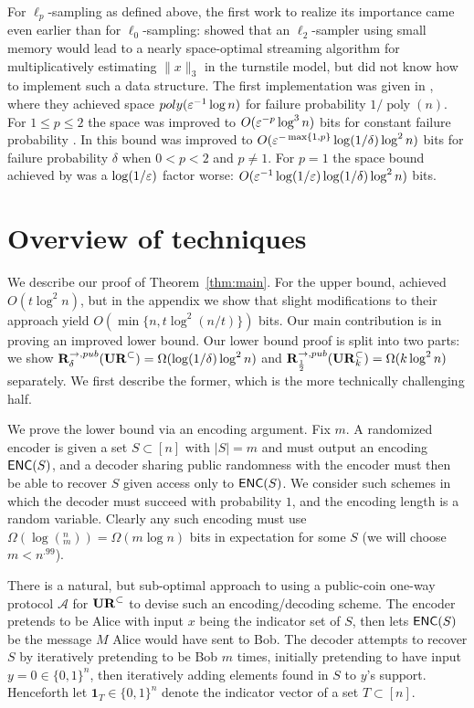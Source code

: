 For $\ell_p$-sampling as defined above, the first work to realize its importance came even earlier than for $\ell_0$-sampling: \cite{CoppersmithK04} showed that an $\ell_2$-sampler using small memory would lead to a nearly space-optimal streaming algorithm for multiplicatively estimating $\|x\|_3$ in the turnstile model, but did not know how to implement such a data structure. The first implementation was given in \cite{MonemizadehW10}, where they achieved space $\mathop{poly}(\varepsilon^{-1}\log n)$ for failure probability $1/\mathop{poly}(n)$. For $1\le p\le 2$ the space was improved to $O(\varepsilon^{-p}\log^3 n)$ bits for constant failure probability \cite{AndoniKO11}. In \cite{JowhariST11} this bound was improved to $O(\varepsilon^{-\max\{1,p\}}\log(1/\delta)\log^2 n)$ bits for failure probability $\delta$ when $0<p<2$ and $p\neq 1$. For $p=1$ the space bound achieved by \cite{JowhariST11} was a $\log(1/\varepsilon)$ factor worse: $O(\varepsilon^{-1}\log(1/\varepsilon)\log(1/\delta)\log^2 n)$ bits.


\section{Overview of techniques}
We describe our proof of Theorem~\ref{thm:main}. For the upper bound, \cite{JowhariST11} achieved $O(t\log^2n)$, but in the appendix we show that slight modifications to their approach yield $O(\min\{n,t\log^2(n/t)\})$ bits. Our main contribution is in proving an improved lower bound. Our lower bound proof is split into two parts: we show $\mathbf{R}^{\rightarrow,pub}_\delta(\mathbf{UR}^\subset) = \Omega(\log(1/\delta)\log^2 n)$ and $\mathbf{R}^{\rightarrow,pub}_{\frac 12}(\mathbf{UR}_k^\subset)=\Omega(k\log^2n)$ separately. We first describe the former, which is the more technically challenging half.

We prove the lower bound via an encoding argument. Fix $m$. A randomized encoder is given a set $S\subset[n]$ with $|S| = m$ and must output an encoding $\textsf{ENC}(S)$, and a decoder sharing public randomness with the encoder must then be able to recover $S$ given access only to $\textsf{ENC}(S)$. We consider such schemes in which the decoder must succeed with probability $1$, and the encoding length is a random variable. Clearly any such encoding must use $\Omega(\log(^n_m)) = \Omega(m\log n)$ bits in expectation for some $S$ (we will choose $m < n^{.99}$).

There is a natural, but sub-optimal approach to using a public-coin one-way protocol $\mathcal{A}$ for $\mathbf{UR}^\subset$ to devise such an encoding/decoding scheme.  The encoder pretends to be Alice with input $x$ being the indicator set of $S$, then lets $\textsf{ENC}(S)$ be the message $M$ Alice would have sent to Bob. The decoder attempts to recover $S$ by iteratively pretending to be Bob $m$ times, initially pretending to have input $y=0\in\{0,1\}^n$, then iteratively adding elements found in $S$ to $y$'s support. Henceforth let $\mathbf{1}_T\in\{0,1\}^n$ denote the indicator vector of a set $T\subset[n]$.


